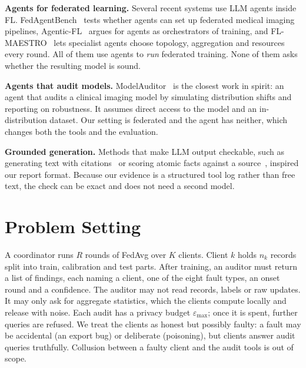 \documentclass[conference]{IEEEtran}
\begin{document}
\textbf{Agents for federated learning.} Several recent systems use LLM agents inside FL.
FedAgentBench~\cite{saha2025fedagentbench} tests whether agents can set up federated medical imaging
pipelines, Agentic-FL~\cite{jarczewski2026agentic} argues for agents as orchestrators of training,
and FL-MAESTRO~\cite{wu2026flmaestro} lets specialist agents choose topology, aggregation and
resources every round. All of them use agents to \emph{run} federated training. None of them asks
whether the resulting model is sound.

\textbf{Agents that audit models.} ModelAuditor~\cite{kuhn2025modelauditor} is the closest work in
spirit: an agent that audits a clinical imaging model by simulating distribution shifts and
reporting on robustness. It assumes direct access to the model and an in-distribution dataset. Our
setting is federated and the agent has neither, which changes both the tools and the evaluation.

\textbf{Grounded generation.} Methods that make LLM output checkable, such as generating text with
citations~\cite{gao2023alce} or scoring atomic facts against a source~\cite{min2023factscore}, inspired
our report format. Because our evidence is a structured tool log rather than free text, the check can
be exact and does not need a second model.

\section{Problem Setting}

A coordinator runs $R$ rounds of FedAvg over $K$ clients. Client $k$ holds $n_k$ records split into
train, calibration and test parts. After training, an auditor must return a list of findings, each
naming a client, one of the eight fault types, an onset round and a confidence. The auditor may
not read records, labels or raw updates. It may only ask for aggregate statistics, which the
clients compute locally and release with noise. Each audit has a privacy budget $\varepsilon_{\max}$;
once it is spent, further queries are refused. We treat the clients as honest but possibly faulty:
a fault may be accidental (an export bug) or deliberate (poisoning), but clients answer audit
queries truthfully. Collusion between a faulty client and the audit tools is out of scope.

\end{document}

